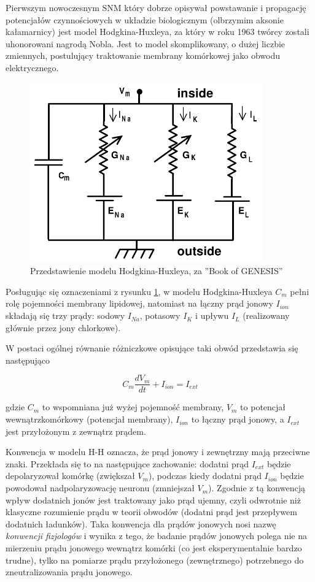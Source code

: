   Pierwszym nowoczesnym SNM który dobrze opisywał powstawanie i propagację potencjałów czynnościowych w układzie biologicznym (olbrzymim aksonie kałamarnicy) jest model Hodgkina-Huxleya, za który w roku 1963 twórcy zostali uhonorowani nagrodą Nobla. Jest to model skomplikowany, o dużej liczbie zmiennych, postulujący traktowanie membrany komórkowej jako obwodu elektrycznego.

  \begin{figure}
    \includegraphics[width=100mm]{images/hh.png}
    \caption{Przedstawienie modelu Hodgkina-Huxleya, za ''Book of GENESIS'' \cite{genesis}}
    \label{fig:graphics:genesis}
  \end{figure}

  Posługując się oznaczeniami z rysunku \ref{fig:graphics:genesis}, w modelu Hodgkina-Huxleya $C_{m}$ pełni rolę pojemności membrany lipidowej, natomiast na łączny prąd jonowy $I_{ion}$ składają się trzy prądy: sodowy $I_{Na}$, potasowy $I_{K}$ i upływu $I_{L}$ (realizowany głównie przez jony chlorkowe).

  W postaci ogólnej równanie różniczkowe opisujące taki obwód przedstawia się następująco

  \begin{equation} \label{hh:1}
    C_{m} \frac{dV_{m}}{dt} + I_{ion} = I_{ext}
  \end{equation}

  gdzie $C_{m}$ to wspomniana już wyżej pojemność membrany, $V_{m}$ to potencjał wewnątrzkomórkowy (potencjał membrany), $I_{ion}$ to łączny prąd jonowy, a $I_{ext}$ jest przyłożonym z zewnątrz prądem.

  Konwencja w modelu H-H oznacza, że prąd jonowy i zewnętrzny mają przeciwne znaki. Przekłada się to na następujące zachowanie: dodatni prąd $I_{ext}$ będzie depolaryzował komórkę (zwiększał $V_{m}$), podczas kiedy dodatni prąd $I_{ion}$ będzie powodował nadpolaryzowację neuronu (zmniejszał $V_{m}$). Zgodnie z tą konwencją wpływ dodatnich jonów jest traktowany jako prąd ujemny, czyli odwrotnie niż klasyczne rozumienie prądu w teorii obwodów (dodatni prąd jest przepływem dodatnich ładunków). Taka konwencja dla prądów jonowych nosi nazwę \emph{konwencji fizjologów} i wynika z tego, że badanie prądów jonowych polega nie na mierzeniu prądu jonowego wewnątrz komórki (co jest eksperymentalnie bardzo trudne), tylko na pomiarze prądu przyłożonego (zewnętrznego) potrzebnego do zneutralizowania prądu jonowego.

